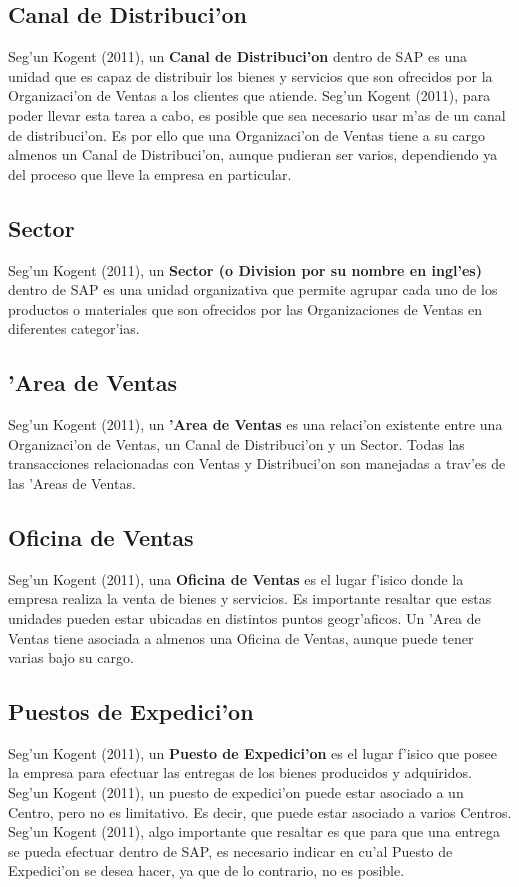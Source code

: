 \subsection{Canal de Distribuci'on}
	Seg'un Kogent (2011), un \textbf{Canal de Distribuci'on} dentro de SAP es una unidad que es capaz de distribuir los bienes y servicios que son ofrecidos por la Organizaci'on de Ventas a los clientes que atiende.
\newline
\newline
\indent Seg'un Kogent (2011), para poder llevar esta tarea a cabo, es posible que sea necesario usar m'as de un canal de distribuci'on. Es por ello que una Organizaci'on de Ventas tiene a su cargo almenos un Canal de Distribuci'on, aunque pudieran ser varios, dependiendo ya del proceso que lleve la empresa en particular.

\subsection{Sector}
	Seg'un Kogent (2011), un \textbf{Sector (o Division por su nombre en ingl'es)} dentro de SAP es una unidad organizativa que permite agrupar cada uno de los productos o materiales que son ofrecidos por las Organizaciones de Ventas en diferentes categor'ias. 
	
\subsection{'Area de Ventas}
	Seg'un Kogent (2011), un \textbf{'Area de Ventas} es una relaci'on existente entre una Organizaci'on de Ventas, un Canal de Distribuci'on y un Sector. Todas las transacciones relacionadas con Ventas y Distribuci'on son manejadas a trav'es de las 'Areas de Ventas.
	
\subsection{Oficina de Ventas}
	Seg'un Kogent (2011), una \textbf{Oficina de Ventas} es el lugar f'isico donde la empresa realiza la venta de bienes y servicios. Es importante resaltar que estas unidades pueden estar ubicadas en distintos puntos geogr'aficos. 
	Un 'Area de Ventas tiene asociada a almenos una Oficina de Ventas, aunque puede tener varias bajo su cargo.

\subsection{Puestos de Expedici'on}
	Seg'un Kogent (2011), un \textbf{Puesto de Expedici'on} es el lugar f'isico que posee la empresa para efectuar las entregas de los bienes producidos y adquiridos.
	Seg'un Kogent (2011), un puesto de expedici'on puede estar asociado a un Centro, pero no es limitativo. Es decir, que puede estar asociado a varios Centros.
	Seg'un Kogent (2011), algo importante que resaltar es que para que una entrega se pueda efectuar dentro de SAP, es necesario indicar en cu'al Puesto de Expedici'on se desea hacer, ya que de lo contrario, no es posible.
	
